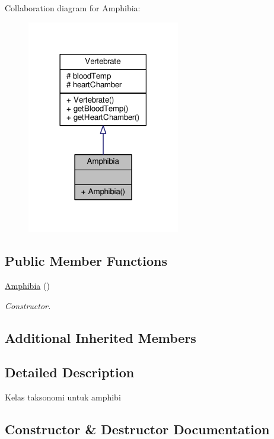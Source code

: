 Collaboration diagram for Amphibia\+:
\nopagebreak
\begin{figure}[H]
\begin{center}
\leavevmode
\includegraphics[width=189pt]{classAmphibia__coll__graph}
\end{center}
\end{figure}
\subsection*{Public Member Functions}
\begin{DoxyCompactItemize}
\item 
\hyperlink{classAmphibia_ae1a692326c911b131cee2fbb615a9786}{Amphibia} ()
\begin{DoxyCompactList}\small\item\em Constructor. \end{DoxyCompactList}\end{DoxyCompactItemize}
\subsection*{Additional Inherited Members}


\subsection{Detailed Description}
Kelas taksonomi untuk amphibi 

\subsection{Constructor \& Destructor Documentation}
